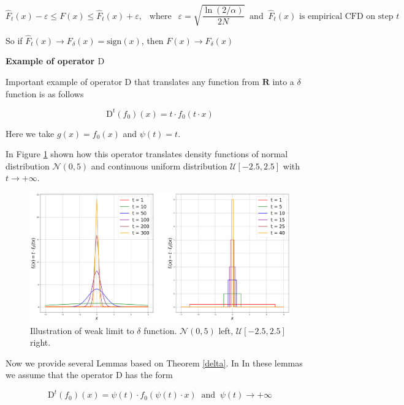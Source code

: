 \documentclass{article}
\begin{document}
    \begin{equation*}
        \hat{F}_t(x) - \varepsilon \leq F(x) \leq \hat{F}_t(x) + \varepsilon, ~~ \text{ where } ~~ \varepsilon = \sqrt{\dfrac{\ln(2/\alpha)}{2N}} ~\text{ and }~ \hat{F}_t(x) \text{ is empirical CFD on step } t
    \end{equation*}

    So if $\hat{F}_t(x) \to F_{\delta}(x) = \text{sign}(x)$, then $F(x) \to F_{\delta}(x)$

    \textbf{Example of operator $\text{D}$}
    
    Important example of operator $\text{D}$ that translates any function from $\mathbf{R}$ into a $\delta$ function is as follows

    \begin{equation} \label{example1}
        \text{D}^t(f_0)(x) = t \cdot f_0(t \cdot x)
    \end{equation}

    Here we take $g(x) = f_0(x)$ and $\psi(t) = t$. 
    
    In Figure \ref{example1_fig} shown how this operator translates density functions of normal distribution $\mathcal{N}(0, 5)$ and continuous uniform distribution $\mathcal{U}[-2.5, 2.5]$ with $t \to +\infty$.

    \begin{figure}[h!]
        \centering
        \includegraphics[width = 0.99\linewidth]{pictures/example1.png}
        \caption{Illustration of weak limit to $\delta$ function. $\mathcal{N}(0, 5)$ left, $\mathcal{U}[-2.5, 2.5]$ right.}
        \label{example1_fig}
    \end{figure}

    Now we provide several Lemmas based on Theorem \ref{delta}. In In these lemmas we assume that the operator $\text{D}$ has the form

    \begin{equation} \label{cool_D}
        \text{D}^t(f_0)(x) = \psi(t) \cdot f_0(\psi(t) \cdot x) ~\text{ and }~ \psi(t) \to +\infty
    \end{equation}
\end{document}
